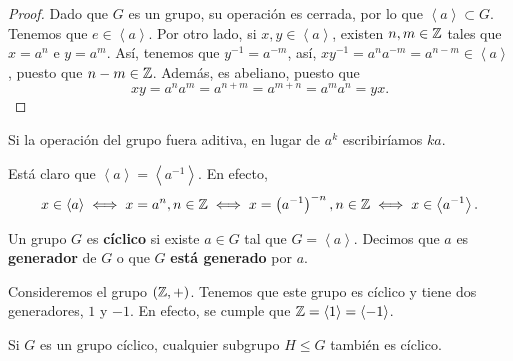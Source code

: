 \begin{proof}
Dado que $\displaystyle G $ es un grupo, su operación es cerrada, por lo que $\displaystyle \left\langle a \right\rangle \subset G $. Tenemos que $\displaystyle e \in \left\langle a \right\rangle  $. Por otro lado, si $\displaystyle x,y \in \left\langle a \right\rangle  $, existen $\displaystyle n,m \in \mathbb{Z} $ tales que $\displaystyle x = a^{n} $ e $\displaystyle y = a^{m} $.
Así, tenemos que $\displaystyle y^{-1} = a^{-m} $, así, $\displaystyle xy^{-1} = a^{n}a^{-m} = a^{n - m} \in \left\langle a \right\rangle  $, puesto que $\displaystyle n - m \in \mathbb{Z} $. Además, es abeliano, puesto que 
\[ x y = a^{n}a^{m} = a^{n + m} = a^{m + n} = a^{m}a^{n} = yx.\]
\end{proof}
\begin{notation}
Si la operación del grupo fuera aditiva, en lugar de $\displaystyle a^{k} $ escribiríamos $\displaystyle ka $.
\end{notation}
\begin{observation}
Está claro que $\displaystyle \left\langle a \right\rangle  = \left\langle a^{-1} \right\rangle  $. En efecto, 
\[x \in \left\langle a \right\rangle \iff x = a^{n}, n \in \mathbb{Z} \iff x = \left(a^{-1}\right)^{-n}, n \in \mathbb{Z} \iff x \in \left\langle a^{-1} \right\rangle  .\]
\end{observation}
\begin{definition}
Un grupo $\displaystyle G $ es \textbf{cíclico} si existe $\displaystyle a \in G $ tal que $\displaystyle G = \left\langle a \right\rangle  $. Decimos que $\displaystyle a $ es \textbf{generador} de $\displaystyle G $ o que $\displaystyle G $ \textbf{está generado} por $\displaystyle a $.
\end{definition}
\begin{eg}
Consideremos el grupo $\displaystyle \left(\mathbb{Z}, +\right) $. Tenemos que este grupo es cíclico y tiene dos generadores, $\displaystyle 1 $ y $\displaystyle -1 $. En efecto, se cumple que $\displaystyle \mathbb{Z} = \left\langle 1 \right\rangle  = \left\langle -1 \right\rangle  $.
\end{eg}
\begin{prop}
Si $\displaystyle G $ es un grupo cíclico, cualquier subgrupo $\displaystyle H \leq G $ también es cíclico.
\end{prop}
